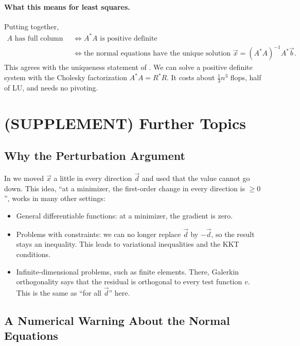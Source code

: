 \paragraph{What this means for least squares.} Putting  together,
\begin{equation}
  \begin{aligned}
    A \text{ has full column rank} &\iff A^\ast A \text{ is positive definite} \\
    &\iff \text{the normal equations have the unique solution } \vec{x} = (A^\ast A)^{-1}A^\ast\vec{b}.
  \end{aligned}
\end{equation}
This agrees with the uniqueness statement of . We can solve a positive definite system with the Cholesky factorization $A^\ast A = R^\ast R$. It costs about $\frac{1}{3}n^3$ flops, half of LU, and needs no pivoting.

\section{(SUPPLEMENT) Further Topics}
\subsection{Why the Perturbation Argument}

In  we moved $\vec{x}$ a little in every direction $\vec{d}$ and used that the value cannot go down. This idea, ``at a minimizer, the first-order change in every direction is $\ge 0$'', works in many other settings:
\begin{itemize}
  \item General differentiable functions: at a minimizer, the gradient is zero.
  \item Problems with constraints: we can no longer replace $\vec{d}$ by $-\vec{d}$, so the result stays an inequality. This leads to variational inequalities and the KKT conditions.
  \item Infinite-dimensional problems, such as finite elements. There, Galerkin orthogonality says that the residual is orthogonal to every test function $v$. This is the same as ``for all $\vec{d}$'' here.
\end{itemize}

\subsection{A Numerical Warning About the Normal Equations}

